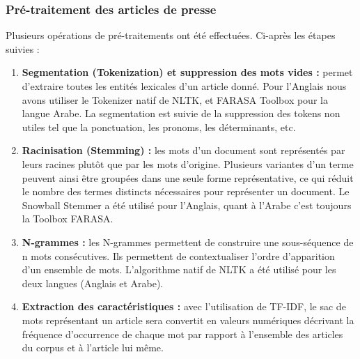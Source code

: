             \subsubsection{Pré-traitement des articles de presse}
             Plusieurs opérations de pré-traitements ont été effectuées. Ci-après les étapes suivies :
            \begin{enumerate}
                \item{\textbf{Segmentation (Tokenization) et suppression des mots vides :} }permet d'extraire toutes les entités lexicales d'un article donné. Pour l'Anglais nous avons utiliser le Tokenizer natif de NLTK, et FARASA Toolbox pour la langue Arabe. La segmentation est suivie de la suppression des tokens non utiles tel que la ponctuation, les pronoms, les déterminants, etc.\\  
                
                \item{\textbf{Racinisation (Stemming) :} }les mots d'un document sont représentés par leurs racines plutôt que par les mots d'origine. Plusieurs variantes d'un terme peuvent ainsi être groupées dans une seule forme représentative, ce qui réduit le nombre des termes distincts nécessaires pour représenter un document. Le Snowball Stemmer a été utilisé pour l'Anglais, quant à l'Arabe c'est toujours la Toolbox FARASA.\\
                
                \item{\textbf{N-grammes :} }les N-grammes permettent de construire une sous-séquence de n mots consécutives. Ils permettent de contextualiser l'ordre d'apparition d'un ensemble de mots. L'algorithme natif de NLTK a été utilisé pour les deux langues (Anglais et Arabe).\\ 
                
                \item{\textbf{Extraction des caractéristiques :} }avec l'utilisation de TF-IDF, le sac de mots représentant un article sera convertit en valeurs numériques décrivant la fréquence d'occurrence de chaque mot par rapport à l'ensemble des articles du corpus et à l'article lui même.\\
            \end{enumerate}

